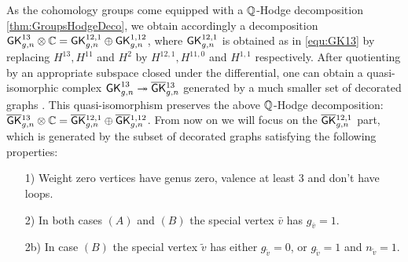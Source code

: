 As the cohomology groups come equipped with a $\mathbb{Q}$-Hodge decomposition \ref{thm:GroupsHodgeDeco}, we obtain accordingly a decomposition $\mathsf{GK}_{g,n}^{13}\otimes\mathbb{C} = \mathsf{GK}_{g,n}^{12,1} \oplus \mathsf{GK}_{g,n}^{1,12}$, where $\mathsf{GK}_{g,n}^{12,1}$ is obtained as in \ref{equ:GK13} by replacing $H^{13}, H^{11}$ and $H^{2}$ by $H^{12,1}, H^{11,0}$ and $H^{1,1}$ respectively. After quotienting by an appropriate subspace closed under the differential, one can obtain a quasi-isomorphic complex $\mathsf{GK}_{g,n}^{13}\twoheadrightarrow \overline{\mathsf{GK}}{}_{g,n}^{13}$ generated by a much smaller set of decorated graphs \cite[Section 2.2]{CLPW2}. This quasi-isomorphism preserves the above $\mathbb{Q}$-Hodge decomposition: $\overline{\mathsf{GK}}{}_{g,n}^{13}\otimes\mathbb{C} = \overline{\mathsf{GK}}{}_{g,n}^{12,1} \oplus \overline{\mathsf{GK}}{}_{g,n}^{1,12}$. From now on we will focus on the $\overline{\mathsf{GK}}{}_{g,n}^{12,1}$ part, which is generated by the subset of decorated graphs satisfying the following properties:

\begin{enumerate}
    \item[1)] Weight zero vertices have genus zero, valence at least $3$ and don't have loops.
    \item[2)] In both cases $(A)$ and $(B)$ the special vertex $\bar{v}$ has $g_{\bar{v}}=1$.
    \item[2b)] In case $(B)$ the special vertex $\tilde{v}$ has either $g_{\tilde{v}}=0$, or $g_{\tilde{v}}=1$ and $n_{\tilde{v}}=1$.
\end{enumerate}

